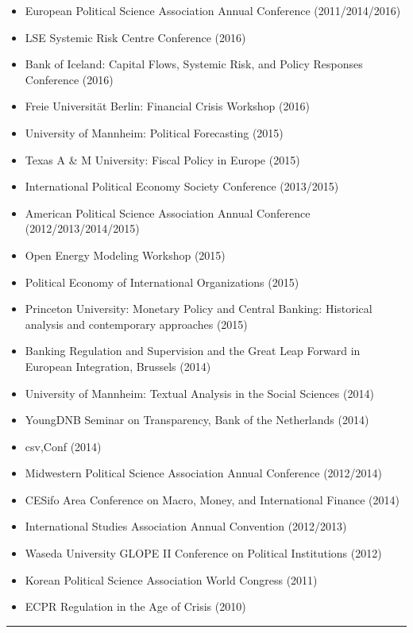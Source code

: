 \documentclass[a4paper]{article}
\begin{document}
{\begin{itemize}
    \item European Political Science Association Annual Conference (2011/2014/2016)
    \item LSE Systemic Risk Centre Conference (2016)
    \item Bank of Iceland: Capital Flows, Systemic Risk, and Policy Responses Conference (2016)
    \item Freie Universit\"{a}t Berlin: Financial Crisis Workshop (2016)
    \item University of Mannheim: Political Forecasting (2015)
    \item Texas A \& M University: Fiscal Policy in Europe (2015)
    \item International Political Economy Society Conference (2013/2015)
    \item American Political Science Association Annual Conference (2012/2013/2014/2015)
    \item Open Energy Modeling Workshop (2015)
    \item Political Economy of International Organizations (2015)
    \item Princeton University: Monetary Policy and Central Banking: Historical analysis and contemporary approaches (2015)
    \item Banking Regulation and Supervision and the Great Leap Forward in European Integration, Brussels (2014)
    \item University of Mannheim: Textual Analysis in the Social Sciences (2014)
    \item YoungDNB Seminar on Transparency, Bank of the Netherlands (2014)
    \item csv,Conf (2014)
    \item Midwestern Political Science Association Annual Conference (2012/2014)
    \item CESifo Area Conference on Macro, Money, and International Finance (2014)
    \item International Studies Association Annual Convention (2012/2013)
    \item Waseda University GLOPE II Conference on Political Institutions (2012)
    \item Korean Political Science Association World Congress (2011)
    \item ECPR Regulation in the Age of Crisis (2010)
\end{itemize}


\vspace{0.25cm}
\medskip\hrule height 1pt
\vspace{0.5cm}

}
\end{document}
